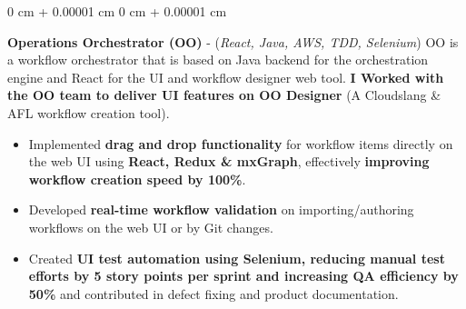 \documentclass[10pt, letterpaper]{article}
\newenvironment{highlights}{
    \begin{itemize}[
        topsep=0.10 cm,
        parsep=0.10 cm,
        partopsep=0pt,
        itemsep=0pt,
        leftmargin=0 cm + 10pt
    ]
}{
    \end{itemize}
} %
\newenvironment{onecolentry}{
    \begin{adjustwidth}{
        0 cm + 0.00001 cm
    }{
        0 cm + 0.00001 cm
    }
}{
    \end{adjustwidth}
} %
\begin{document}
        \vspace{0.20 cm}
        \begin{onecolentry}
            \textbf{Operations Orchestrator (OO)} - (\textit{React, Java, AWS, TDD, Selenium})
            \vspace{0.10 cm}
            \newline OO is a workflow orchestrator that is based on Java backend for the orchestration engine and React for the UI and workflow designer web tool. \textbf{I Worked with the OO team to deliver UI features on OO Designer} (A Cloudslang \& AFL workflow creation tool).
            \begin{highlights}
                \item Implemented \textbf{drag and drop functionality} for workflow items directly on the web UI using \textbf{React, Redux \& mxGraph}, effectively \textbf{improving workflow creation speed by 100\%}.
                \item Developed \textbf{real-time workflow validation} on importing/authoring workflows on the web UI or by Git changes.
                \item Created \textbf{UI test automation using Selenium, reducing manual test efforts by 5 story points per sprint and increasing QA efficiency by 50\%} and contributed in defect fixing and product documentation.
            \end{highlights}
        \end{onecolentry}


        \vspace{0.5 cm}
\end{document}
